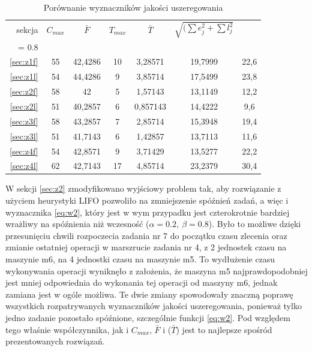\documentclass[twoside]{kInzynierka}
\begin{document}
\begin{table}[htb]
	\centering
	\caption{Porównanie wyznaczników jakości uszeregowania}
	\begin{tabular}{ r | c | c | c | c | c | c }
	sekcja        & \(C_{max}\)	& \(\bar{F}\)   & \(T_{max}\) & \(\bar{T}\) & \(\sqrt{(\sum e_j^2 + \sum l_j^2}\) & \( \alpha*\sum e_j + \beta*\sum l_j \Big|_{\substack{\alpha = 0.2\\ \beta = 0.8}} \) \\ \hline
	\ref{sec:z1f} & 55          & 42,4286       & 10          & 3,28571      & 19,7999      & 22,6 \\ 
	\ref{sec:z1l} & 54          & 44,4286       & 9           & 3,85714      & 17,5499      & 23,8 \\ \hline
	\ref{sec:z2f} & 58          & 42            & 5           & 1,57143      & 13,1149      & 12,2 \\ 
    \ref{sec:z2l} & 51          & 40,2857       & 6           & 0,857143     & 14,4222      & 9,6  \\ \hline
	\ref{sec:z3f} & 58          & 43,2857       & 7           & 2,85714      & 15,3948      & 19,4 \\ 
	\ref{sec:z3l} & 51          & 41,7143       & 6           & 1,42857      & 13,7113      & 11,6 \\ \hline
	\ref{sec:z4f} & 54          & 42,8571       & 9           & 3,71429      & 13,5277      & 22,2 \\ 
	\ref{sec:z4l} & 62          & 42,7143       & 17          & 4,85714      & 23,2379      & 30,4 \\ 
	\end{tabular}
\end{table}

W sekcji \ref{sec:z2} zmodyfikowano wyjściowy problem tak, aby rozwiązanie z użyciem heurystyki LIFO pozwoliło na zmniejszenie spóźnień zadań, a więc i wyznacznika \eqref{eq:w2}, który jest w wym przypadku jest czterokrotnie bardziej wrażliwy na spóźnienia niż wczesność (\(\alpha = 0.2,~\beta = 0.8\)). Było to możliwe dzięki przesunięciu chwili rozpoczecia zadania nr 7 do początku czasu zlecenia oraz zmianie ostatniej operacji w marszrucie zadania nr 4, z 2 jednostek czasu na maszynie m6, na 4 jednostki czasu na maszynie m5. To wydłużenie czasu wykonywania operacji wyniknęło z założenia, że maszyna m5 najprawdopodobniej jest mniej odpowiednia do wykonania tej operacji od maszyny m6, jednak zamiana jest w ogóle możliwa. Te dwie zmiany spowodowały znaczną poprawę wszystkich rozpatrywanych wyznaczników jakości uszeregowania, ponieważ tylko jedno zadanie pozostało spóźnione, szczególnie funkcji \eqref{eq:w2}. Pod względem tego właśnie współczynnika, jak i \(C_{max}\), \(\bar{F}\)  i (\(\bar{T}\)) jest to najlepsze spośród prezentowanych rozwiązań.
\end{document}

